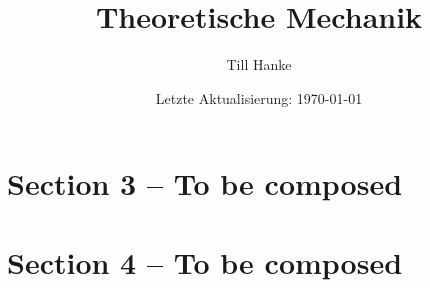 \documentclass{scrartcl}
\begin{document}
\title{Theoretische Mechanik}
\author{Till Hanke}
\date{Letzte Aktualisierung: \today}

\maketitle
\tableofcontents



\section{Section 3 -- To be composed}
\section{Section 4 -- To be composed}


\end{document}
